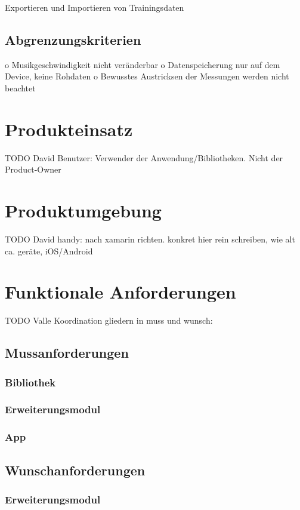 \documentclass[a4paper,12pt]{article}
\begin{document}
  Exportieren und Importieren von Trainingsdaten
  \subsection{Abgrenzungskriterien}
  o	Musikgeschwindigkeit nicht veränderbar
o	Datenspeicherung nur auf dem Device, keine Rohdaten
o	Bewusstes Austricksen der Messungen werden nicht beachtet


\section{Produkteinsatz}
TODO David 
Benutzer:   Verwender der Anwendung/Bibliotheken. Nicht der Product-Owner

\section{Produktumgebung}
TODO David
handy: nach xamarin richten. konkret hier rein schreiben, wie alt ca. geräte, iOS/Android

\section{Funktionale Anforderungen}
TODO Valle Koordination
gliedern in muss und wunsch:
  \subsection{Mussanforderungen}
    \subsubsection{Bibliothek}
    \subsubsection{Erweiterungsmodul}
    \subsubsection{App}
  \subsection{Wunschanforderungen}
    \subsubsection{Erweiterungsmodul}
\end{document}
